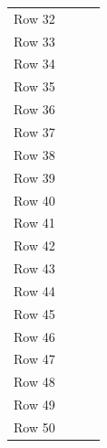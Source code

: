 \begin{longtable}{cccc}
  Row 32 & & & \\
  Row 33 & & & \\
  Row 34 & & & \\
  Row 35 & & & \\
  Row 36 & & & \\
  Row 37 & & & \\
  Row 38 & & & \\
  Row 39 & & & \\
  Row 40 & & & \\
  Row 41 & & & \\
  Row 42 & & & \\
  Row 43 & & & \\
  Row 44 & & & \\
  Row 45 & & & \\
  Row 46 & & & \\
  Row 47 & & & \\
  Row 48 & & & \\
  Row 49 & & & \\
  Row 50 & & & \\
\end{longtable}

